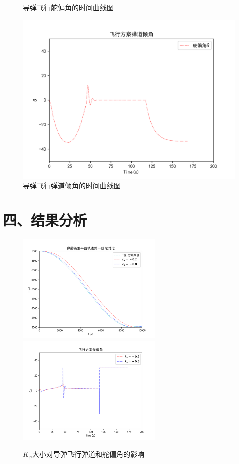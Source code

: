 \documentclass[forprint]{NWPUBachelor}
\begin{document}
\begin{itemize}
\begin{figure}[H]
    \caption{导弹飞行舵偏角的时间曲线图}
\end{figure}
\begin{figure}[H]
    \centering
    \includegraphics[width=130mm]{img/飞行弹道倾角.png}
    \caption{导弹飞行弹道倾角的时间曲线图}
\end{figure}

\section*{ 四、结果分析}

\begin{figure}[H]
    \centering
    \includegraphics[width=70mm]{img/飞行轨迹2.png}
    \includegraphics[width=70mm]{img/飞行舵偏角2.png}
    \caption{$K_{\varphi}$大小对导弹飞行弹道和舵偏角的影响}\label{fig:k1}
\end{figure}


\end{itemize}
\end{document}
